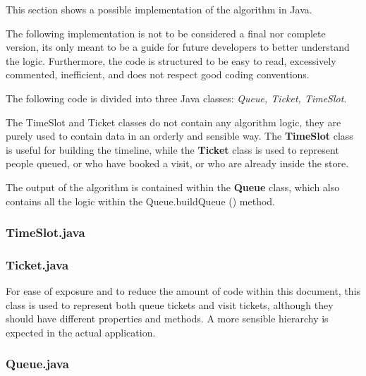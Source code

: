 This section shows a possible implementation of the algorithm in Java.

The following implementation is not to be considered a final nor complete version, its only meant to be a guide for future developers to better understand the logic. Furthermore, the code is structured to be easy to read, excessively commented, inefficient, and does not respect good coding conventions.

The following code is divided into three Java classes: \textit{Queue, Ticket, TimeSlot}.

The TimeSlot and Ticket classes do not contain any algorithm logic, they are purely used to contain data in an orderly and sensible way. The \textbf{TimeSlot} class is useful for building the timeline, while the \textbf{Ticket} class is used to represent people queued, or who have booked a visit, or who are already inside the store.

The output of the algorithm is contained within the \textbf{Queue} class, which also contains all the logic within the Queue.buildQueue () method.


\subsubsection*{TimeSlot.java}
\label{subsubsect:timeslotjava}


\subsubsection*{Ticket.java}
\label{subsubsect:ticketjava}

For ease of exposure and to reduce the amount of code within this document, this class is used to represent both queue tickets and visit tickets, although they should have different properties and methods. A more sensible hierarchy is expected in the actual application.\newline
\newline


\subsubsection*{Queue.java}
\label{subsubsect:queuejava}


